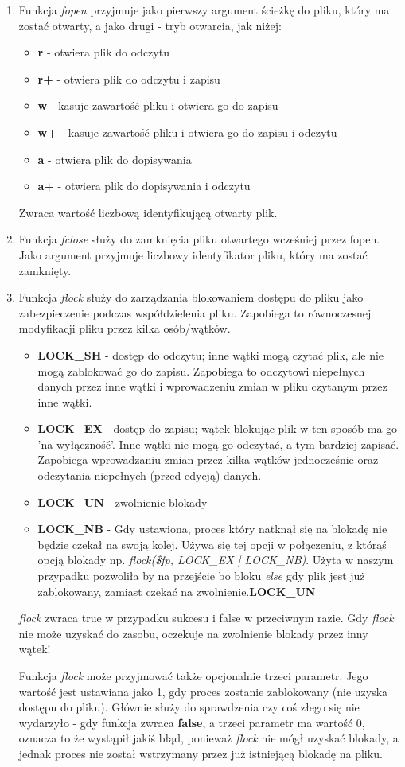 \begin{enumerate}
\item 
Funkcja \textit{fopen} przyjmuje jako pierwszy argument ścieżkę do pliku, który ma zostać otwarty, a jako drugi - tryb otwarcia, jak niżej:
\begin{itemize}
\item
\textbf{r} - otwiera plik do odczytu
\item
\textbf{r+} - otwiera plik do odczytu i zapisu
\item
\textbf{w} - kasuje zawartość pliku i otwiera go do zapisu
\item
\textbf{w+} - kasuje zawartość pliku i otwiera go do zapisu i odczytu
\item
\textbf{a} - otwiera plik do dopisywania
\item
\textbf{a+} - otwiera plik do dopisywania i odczytu
\end{itemize}
Zwraca wartość liczbową identyfikującą otwarty plik.
\item
Funkcja \textit{fclose} służy do zamknięcia pliku otwartego wcześniej przez fopen. Jako argument przyjmuje liczbowy identyfikator pliku, który ma zostać zamknięty.
\item
Funkcja \textit{flock} służy do zarządzania blokowaniem dostępu do pliku jako zabezpieczenie podczas współdzielenia pliku. Zapobiega to równoczesnej modyfikacji pliku przez kilka osób/wątków.
\begin{itemize}
\item
\textbf{LOCK\_SH} - dostęp do odczytu; inne wątki mogą czytać plik, ale nie mogą zablokować go do zapisu. Zapobiega to odczytowi niepełnych danych przez inne wątki i wprowadzeniu zmian w pliku czytanym przez inne wątki.
\item
\textbf{LOCK\_EX} - dostęp do zapisu; wątek blokując plik w ten sposób ma go 'na wyłączność'. Inne wątki nie mogą go odczytać, a tym bardziej zapisać. Zapobiega wprowadzaniu zmian przez kilka wątków jednocześnie oraz odczytania niepełnych (przed edycją) danych.
\item
\textbf{LOCK\_UN} - zwolnienie blokady 
\item
\textbf{LOCK\_NB} - Gdy ustawiona, proces który natknął się na blokadę nie będzie czekał na swoją kolej. Używa się tej opcji w połączeniu, z którąś opcją blokady np. \textit{flock(\$fp, LOCK\_EX | LOCK\_NB)}. Użyta w naszym przypadku pozwoliła by na przejście bo bloku \textit{else} gdy plik jest już zablokowany, zamiast czekać na zwolnienie.\textbf{LOCK\_UN}
\end{itemize}
\textit{flock} zwraca true w przypadku sukcesu i false w przeciwnym razie.
Gdy \textit{flock} nie może uzyskać do zasobu, oczekuje na zwolnienie blokady przez inny wątek!

Funkcja \textit{flock} może przyjmować także opcjonalnie trzeci parametr. Jego wartość jest ustawiana jako 1, gdy proces zostanie zablokowany (nie uzyska dostępu do pliku). Głównie służy do sprawdzenia czy coś złego się nie wydarzyło - gdy funkcja zwraca \textbf{false}, a trzeci parametr ma wartość 0, oznacza to że wystąpił jakiś błąd, ponieważ \textit{flock} nie mógł uzyskać blokady, a jednak proces nie został wstrzymany przez już istniejącą blokadę na pliku.
\end{enumerate}


